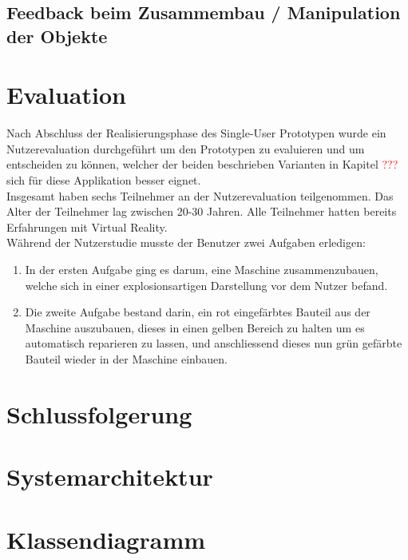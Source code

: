\subsection{Feedback beim Zusammembau / Manipulation der Objekte}
\label{ch:feedback_zusammenbau_manipulation}

\section{Evaluation}
Nach Abschluss der Realisierungsphase des Single-User Prototypen wurde ein Nutzerevaluation durchgeführt um den Prototypen zu evaluieren und um entscheiden zu können, welcher der beiden beschrieben Varianten in Kapitel \textcolor{red}{???} sich für diese Applikation besser eignet. \\

\noindent Insgesamt haben sechs Teilnehmer an der Nutzerevaluation teilgenommen. Das Alter der Teilnehmer lag zwischen 20-30 Jahren. Alle Teilnehmer hatten bereits Erfahrungen mit Virtual Reality. \\

\noindent Während der Nutzerstudie musste der Benutzer zwei Aufgaben erledigen:
\begin{enumerate}
	\item In der ersten Aufgabe ging es darum, eine Maschine zusammenzubauen, welche sich in einer explosionsartigen Darstellung vor dem Nutzer befand.
	
	
	\item Die zweite Aufgabe bestand darin, ein rot eingefärbtes Bauteil aus der Maschine auszubauen, dieses in einen gelben Bereich zu halten um es automatisch reparieren zu lassen, und anschliessend dieses nun grün gefärbte Bauteil wieder in der Maschine einbauen.
	
\end{enumerate}
\section{Schlussfolgerung}

\section{Systemarchitektur}

\section{Klassendiagramm}